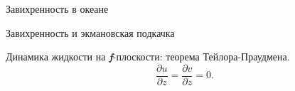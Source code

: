 \begin{chapter}{Завихренность в океане}
\begin{section}{Завихренность и экмановская подкачка}
\begin{paragraph}{Динамика жидкости на \textbf{\textit{f}}-плоскости: 
теорема Тейлора-Праудмена.}
\begin{equation}\label{eq:12.14}
 \boxed{ \frac{\partial{u}}{\partial{z}} = \frac{\partial{v}}{\partial{z}} =0. }
\end{equation}
%
%


\end{paragraph}
\end{section}
\end{chapter}
